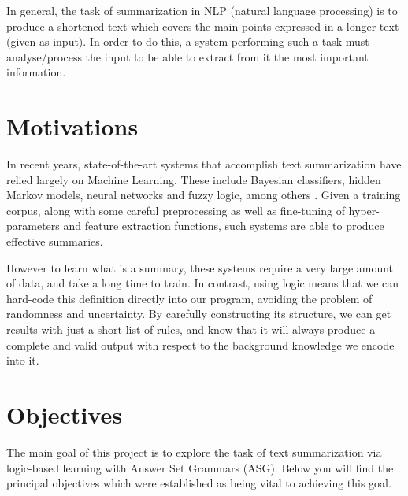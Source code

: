 \label{chapter:introduction}

In general, the task of summarization in NLP (natural language processing) is to produce a shortened text which covers the main points expressed in a longer text (given as input). In order to do this, a system performing such a task must analyse/process the input to be able to extract from it the most important information.

\section{Motivations}

In recent years, state-of-the-art systems that accomplish text summarization have relied largely on Machine Learning. These include Bayesian classifiers, hidden Markov models, neural networks and fuzzy logic, among others \cite{kiyani_survey_2017}. Given a training corpus, along with some careful preprocessing as well as fine-tuning of hyper-parameters and feature extraction functions, such systems are able to produce effective summaries. 

However to learn what is a summary, these systems require a very large amount of data, and take a long time to train. In contrast, using logic means that we can hard-code this definition directly into our program, avoiding the problem of randomness and uncertainty. By carefully constructing its structure, we can get results with just a short list of rules, and know that it will always produce a complete and valid output with respect to the background knowledge we encode into it.

\section{Objectives}

The main goal of this project is to explore the task of text summarization via logic-based learning with Answer Set Grammars (ASG). Below you will find the principal objectives which were established as being vital to achieving this goal.

\begin{objective}

\end{objective}

\begin{objective}

\end{objective}

